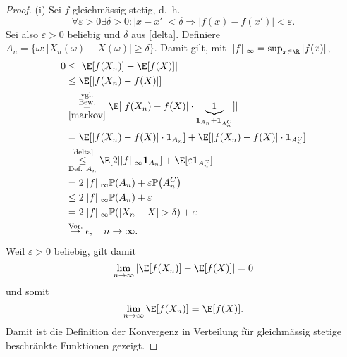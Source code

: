 \begin{proof}
(i) Sei $f$ gleichm\"assig stetig, \mbox{d. h.} 
			\begin{equation}\label{delta}
				\forall \varepsilon>0 \exists \delta > 0\colon |x-x'| < \delta \Rightarrow |f(x)-f(x')| < \varepsilon.
			\end{equation}
			Sei also $\varepsilon > 0$ beliebig und $\delta$ aus \eqref{delta}. Definiere $A_n = \{ \omega\colon |X_n(\omega) - X(\omega)| \geq \delta \}$. Damit gilt, mit $||f||_\infty=\sup_{x\in\R} |f(x)|$,
			\begin{align*}
				0 &\leq | \E[f(X_n)] - \E[f(X)] |\\
				& \leq \E[|f(X_n) - f(X)|]\\
				& \overset{\substack{\text{vgl.}\\\text{Bew.}}}{\underset{\ref{markov}}{=}} \E[|f(X_n) - f(X)|\cdot \underbrace{1}_{\mathbf 1_{A_n}+\mathbf 1_{A_n^C}}]|\\ 
				&= \E[|f(X_n) - f(X)|\cdot \mathbf{1}_{A_n}] + \E[|f(X_n) - f(X)|\cdot \mathbf{1}_{A_n^C}]\\
				&\overset{\text{\eqref{delta}}}{\underset{\text{Def. } A_n}{\leq}} \E[2 ||f||_{\infty} \mathbf{1}_{A_n}] + \E[\varepsilon \mathbf{1}_{A_n^C}]\\
				& = 2 ||f||_{\infty} \mathbb{P}(A_n) + \varepsilon \mathbb{P}\big(A_n^C\big)\\
				&\leq 2 ||f||_{\infty}\mathbb{P}(A_n) + \varepsilon\\
				& = 2 ||f||_{\infty}\mathbb{P}(|X_n-X| > \delta) + \varepsilon\\
				&\overset{\text{Vor.}}{\rightarrow} \epsilon, \quad n\to\infty.
			\end{align*}
			Weil $\varepsilon > 0$ beliebig, gilt damit \[ \lim\limits_{n \to \infty} |\E[f(X_n)] - \E[f(X)]| = 0 \]
			und somit
			\[ \lim\limits_{n \to \infty} \E[f(X_n)] = \E[f(X)]. \]
		Damit ist die Definition der Konvergenz in Verteilung f\"ur gleichm\"assig stetige beschr\"ankte Funktionen gezeigt.\smallskip
		

\end{proof}

